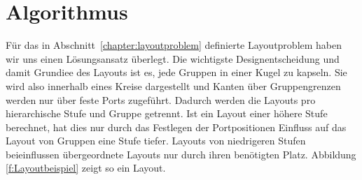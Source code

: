 \chapter{Algorithmus} %
\label{chapter:algo}


Für das in Abschnitt~\ref{chapter:layoutproblem} definierte Layoutproblem haben wir uns einen Lösungsansatz überlegt.
Die wichtigste Designentscheidung und damit Grundiee des Layouts ist es, jede Gruppen in einer Kugel zu kapseln. Sie wird also innerhalb eines Kreise dargestellt und Kanten über Gruppengrenzen werden nur über feste Ports zugeführt.
Dadurch werden die Layouts pro hierarchische Stufe und Gruppe getrennt. 
Ist ein Layout einer höhere Stufe berechnet, hat dies nur durch das Festlegen der Portpositionen Einfluss auf das Layout von Gruppen eine Stufe tiefer.  Layouts von niedrigeren Stufen beieinflussen übergeordnete Layouts nur durch ihren benötigten Platz.
Abbildung \ref{f:Layoutbeispiel} zeigt so ein Layout.




